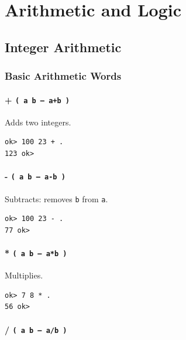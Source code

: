 \part{Arithmetic and Logic}

\chapter{Integer Arithmetic}
\label{chap:arithmetic}

\section{Basic Arithmetic Words}
\label{sec:basic-arith}

\subsection*{+ \texttt{( a b -- a+b )}}

Adds two integers.

\begin{lstlisting}[language=Forth]
ok> 100 23 + .
123 ok>
\end{lstlisting}

\subsection*{- \texttt{( a b -- a-b )}}

Subtracts: removes \texttt{b} from \texttt{a}.

\begin{lstlisting}[language=Forth]
ok> 100 23 - .
77 ok>
\end{lstlisting}

\subsection*{* \texttt{( a b -- a*b )}}

Multiplies.

\begin{lstlisting}[language=Forth]
ok> 7 8 * .
56 ok>
\end{lstlisting}

\subsection*{/ \texttt{( a b -- a/b )}}

